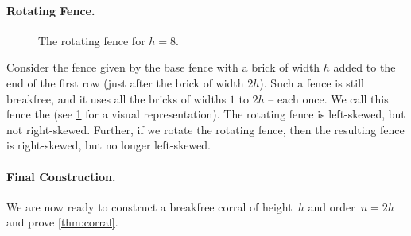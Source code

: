 \documentclass[runningheads,envcountsame]{llncs}
\begin{document}
\paragraph{Rotating Fence.}
\begin{figure}[ht]
    \centering
    \caption{The rotating fence for $h=8$.}
    \label{fig:corral_rotating_fence}
\end{figure}
Consider the fence given by the base fence with a brick of width $h$ added to the end of the first row (just after the brick of width $2h$).
Such a fence is still breakfree, and it uses all the bricks of widths $1$ to $2h$ -- each once.
We call this fence the  (see \cref{fig:corral_rotating_fence} for a visual representation).
The rotating fence is left-skewed, but not right-skewed.
Further, if we rotate the rotating fence, then the resulting fence is right-skewed, but no longer left-skewed.

\paragraph{Final Construction.}
We are now ready to construct a breakfree corral of height~$h$ and order~$n=2h$ and prove \cref{thm:corral}.
\end{document}
